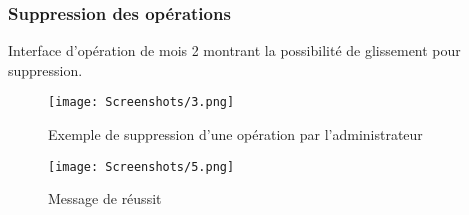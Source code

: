   \subsubsection{Suppression des opérations}
  Interface d'opération de mois 2 montrant la possibilité de glissement pour suppression.
  \begin{figure}[!htbp]
    \begin{minipage}[t]{0.4\textwidth}    %
            \texttt{[image: Screenshots/3.png]}
            \caption{ Exemple de suppression d'une opération par l'administrateur}
    \end{minipage}%
    \begin{minipage}{0.20\textwidth}
      \hfill
    \end{minipage}
  \begin{minipage}[t]{0.4\textwidth}
          \texttt{[image: Screenshots/5.png]}
          \caption{ Message de réussit}
  \end{minipage}%
    \end{figure}


